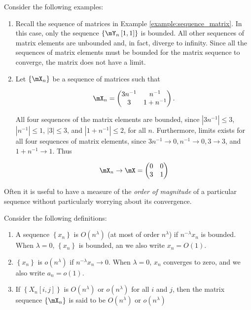 \begin{example}
Consider the following examples:
\begin{enumerate}
 \item Recall the sequence of matrices in Example \ref{example:sequence_matrix}. In this case, only the sequence $\left\lbrace \mY_n\left[1, 1\right]\right\rbrace$ is bounded. All other sequences of matrix elements are unbounded and, in fact, diverge to infinity. Since all the sequences of matrix elements must be bounded for the matrix sequence to converge, the matrix does not have a limit.
 \item Let $\left\lbrace \mX_n\right\rbrace$ be a sequence of matrices such that
 
\begin{equation*}
\mX_n = \begin{pmatrix}
  3n^{-1} & n^{-1} \\
  3       & 1 + n^{-1}
\end{pmatrix}.
\end{equation*}

All four sequences of the matrix elements are bounded, since $\left|3n^{-1}\right|\leq 3$, $\left|n^{-1}\right|\leq 1$, $\left|3\right|\leq 3$, and $\left|1 + n^{-1}\right|\leq 2$, for all $n$. Furthermore, limits exists for all four sequences of matrix elements, since $3n^{-1}\to 0, n^{-1}\to 0, 3\to 3$, and $1 + n^{-1}\to 1$. Thus 

\begin{equation*}
\mX_n\to \mX= \begin{pmatrix}
0 & 0 \\
3 & 1
\end{pmatrix}
\end{equation*}
 \end{enumerate}
\end{example}

Often it is useful to have a measure of the \emph{order of magnitude} of a particular sequence without particularly worrying about its convergence. 
\begin{definition}\label{definition:big_little_oh}
Consider the following definitions:
	\begin{enumerate}
		\item A sequence $\left\lbrace x_n \right\rbrace $ is $O(n^{\lambda})$ (at most of order $n^{\lambda}$) if $n^{-\lambda}x_n$ is bounded. When $\lambda=0$, $\left\lbrace x_n \right\rbrace $ is bounded, an we also write $x_n=O(1)$.
		\item $\left\lbrace x_n \right\rbrace $ is $o(n^{\lambda})$ if $n^{-\lambda}x_n\to 0$. When $\lambda=0$, $x_n$ converges to zero, and we also write $a_n=o(1)$.
		\item If $\left\lbrace X_n\left[i,j\right]\right\rbrace$ is $O(n^\lambda)$ or $o(n^\lambda)$ for all $i$ and $j$, then the matrix sequence $\left\lbrace \mX_n\right\rbrace$ is said to be $O(n^\lambda)$ or $o(n^\lambda)$
	\end{enumerate}
\end{definition}

